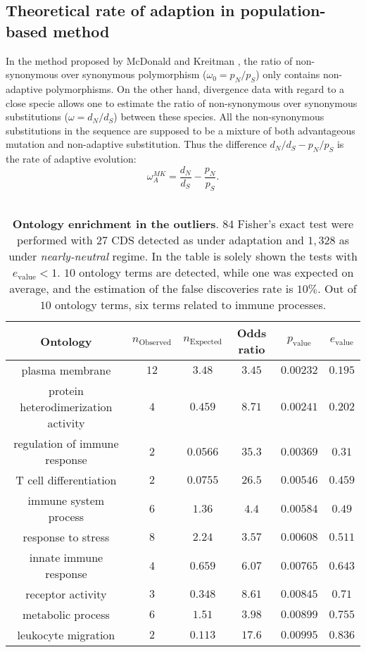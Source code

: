 \documentclass{article}
\begin{document}
	\subsection*{Theoretical rate of adaption in population-based method}
	In the method proposed by McDonald and Kreitman \cite{McDonald1991}, the ratio of non-synonymous over synonymous polymorphism ($\omega_{0}=p_N/p_S$) only contains non-adaptive polymorphisms. On the other hand, divergence data with regard to a close specie allows one to estimate the ratio of non-synonymous over synonymous substitutions ($\omega=d_N/d_S$) between these species. All the non-synonymous substitutions in the sequence are supposed to be a mixture of both advantageous mutation and non-adaptive substitution. Thus the difference $d_N/d_S - p_N/p_S$ is the rate of adaptive evolution:
	\begin{equation*}
	\omega_A^{MK}=\dfrac{d_N}{d_S} - \dfrac{p_N}{p_S}.
	\end{equation*}\\
		\begin{table*}[hb!]
		\centering
		\begin{adjustbox}{width = 1\textwidth}
			\small\begin{tabular}{|c|c|c|c|c|c|}
				\hline
				Ontology & $n_{\mathrm{Observed}}$ & $n_{\mathrm{Expected}}$ & Odds ratio & $p_{\mathrm{value}}$ & $e_{\mathrm{value}}$\\
				\hline
				plasma membrane & $12$ & $3.48$ & $3.45$ & $0.00232$ & $0.195$\\
				protein heterodimerization activity & $4$ & $0.459$ & $8.71$ & $0.00241$ & $0.202$\\
				regulation of immune response & $2$ & $0.0566$ & $35.3$ & $0.00369$ & $0.31$\\
				T cell differentiation & $2$ & $0.0755$ & $26.5$ & $0.00546$ & $0.459$\\
				immune system process & $6$ & $1.36$ & $4.4$ & $0.00584$ & $0.49$\\
				response to stress & $8$ & $2.24$ & $3.57$ & $0.00608$ & $0.511$\\
				innate immune response & $4$ & $0.659$ & $6.07$ & $0.00765$ & $0.643$\\
				receptor activity & $3$ & $0.348$ & $8.61$ & $0.00845$ & $0.71$\\
				metabolic process & $6$ & $1.51$ & $3.98$ & $0.00899$ & $0.755$\\
				leukocyte migration & $2$ & $0.113$ & $17.6$ & $0.00995$ & $0.836$\\
				\hline
			\end{tabular}
		\end{adjustbox}
		\caption{\textbf{Ontology enrichment in the outliers}. 84 Fisher's exact test were performed with $27$ CDS detected as under adaptation and $1,328$ as under \textit{nearly-neutral} regime. In the table is solely shown the tests with $e_{\mathrm{value}} < 1$. $10$ ontology terms are detected, while one was expected on average, and the estimation of the false discoveries rate is $10\%$. Out of $10$ ontology terms, six terms related to immune processes. \label{fig:ontology}}
	\end{table*}
\end{document}
